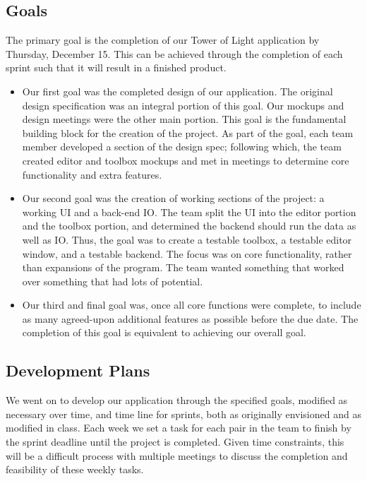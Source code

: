 \documentclass[12pt]{extarticle}
\begin{document}
\subsection{Goals}
The primary goal is the completion of our Tower of Light application by Thursday, December 15. This can be achieved through the completion of  each sprint such that it will result in a finished product.
	\begin{itemize}
		\item Our first goal was the completed design of our application. The original design specification was an integral portion of this goal.  Our mockups and design meetings were the other main portion.  This goal is the fundamental building block for the creation of the project.  As part of the goal, each team member developed a section of the design spec; following which, the team created editor and toolbox mockups and met in meetings to determine core functionality and extra features.
		\item Our second goal was the creation of working sections of the project: a working UI and a back-end IO.  The team split the UI into the editor portion and the toolbox portion, and determined the backend should run the data as well as IO.  Thus, the goal was to create a testable toolbox, a testable editor window, and a testable backend.  The focus was on core functionality, rather than expansions of the program.  The team wanted something that worked over something that had lots of potential.
		\item Our third and final goal was, once all core functions were complete, to include as many agreed-upon additional features as possible before the due date. The completion of this goal is equivalent to achieving our overall goal.  
	\end{itemize}
\subsection{Development Plans}
We went on to develop our application through the specified goals, modified as necessary over time, and time line for sprints, both as originally envisioned and as modified in class. Each week we set a task for each pair in the team to finish by the sprint deadline until the project is completed. Given time constraints, this will be a difficult process with multiple meetings to discuss the completion and feasibility of these weekly tasks. 
\end{document}
